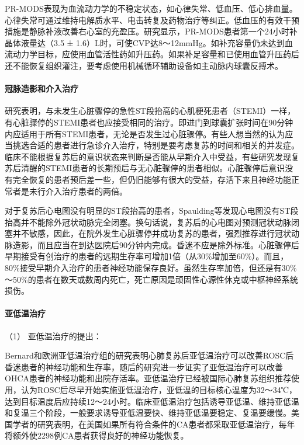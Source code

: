 PR-MODS表现为血流动力学的不稳定状态，如心律失常、低血压、低心排血量。心律失常可通过维持电解质水平、电击转复及药物治疗等纠正。低血压的有效干预措施是静脉补液改善右心室的充盈压。研究显示，PR-MODS患者第一个24小时补晶体液量达（3.5
±
1.6）L时，可使CVP达8～12mmHg。如补充容量仍未达到血流动力学目标，应使用血管活性药如升压药。如果补足容量和已使用血管升压药后还不能恢复组织灌注，要考虑使用机械循环辅助设备如主动脉内球囊反搏术。

\paragraph{冠脉造影和介入治疗}

研究表明，与未发生心脏骤停的急性ST段抬高的心肌梗死患者（STEMI）一样，有心脏骤停的STEMI患者也应接受相同的治疗。即进门到球囊扩张时间在90分钟内应适用于所有STEMI患者，无论是否发生过心脏骤停。有些人想当然的认为应当挑选合适的患者进行急诊介入治疗，特别是要考虑复苏的时间和相关的并发症。临床不能根据复苏后的意识状态来判断是否能从早期介入中受益，有些研究发现复苏后清醒的STEMI患者的长期预后与无心脏骤停的患者相似。心脏骤停后意识没有完全恢复的患者预后差一些，但仍旧能够有很大的受益，存活下来且神经功能正常者是未行介入治疗患者的两倍。

对于复苏后心电图没有明显的ST段抬高的患者，Spaulding等发现心电图没有ST段抬高并不能除外冠状动脉完全闭塞。换句话说，复苏后的心电图对预测冠状动脉闭塞并不敏感，因此，在院外发生心脏骤停并成功复苏的患者，强烈推荐进行冠状动脉造影，而且应当在到达医院后90分钟内完成。昏迷不应是除外标准。心脏骤停后早期接受有创治疗的患者的远期生存率可增加1倍（从30\%增加至60\%）。而且，80\%接受早期介入治疗的患者神经功能保存良好。虽然生存率加倍，但还是有30\%～50\%的患者在数天或数周内死亡，死亡原因是顽固性心源性休克或中枢神经系统损伤。

\paragraph{亚低温治疗}

\hypertarget{text00286.htmlux5cux23CHP10-1-7-3-8-1}{}
（1） 亚低温治疗的提出：

Bernard和欧洲亚低温治疗组的研究表明心肺复苏后亚低温治疗可以改善ROSC后昏迷患者的神经功能和生存率，随后的研究进一步证实了亚低温治疗可以改善OHCA患者的神经功能和出院存活率。亚低温治疗已经被国际心肺复苏组织推荐使用，认为ROSC后尽早开始实施亚低温治疗，亚低温的目标核心温度为32～34℃，达到目标温度后应持续12～24小时。临床亚低温治疗包括诱导亚低温、维持亚低温和复温三个阶段，一般要求诱导亚低温要快、维持亚低温要稳定、复温要缓慢。美国学者的研究表明，在美国如果所有符合条件的CA患者都采取亚低温治疗，每年将额外使2298例CA患者获得良好的神经功能恢复。

